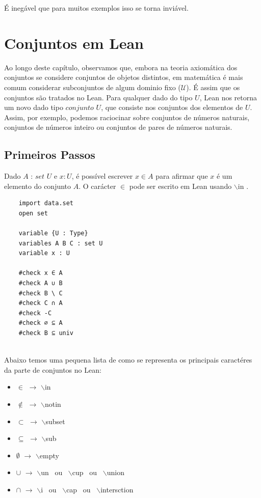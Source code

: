     É inegável que para muitos exemplos isso se torna inviável.

\section{Conjuntos em Lean}
    
    Ao longo deste capítulo, observamos que, embora na teoria axiomática dos conjuntos se considere conjuntos de objetos distintos, em matemática é mais comum considerar subconjuntos de algum dominio fixo ($\mathcal U $). É assim que os conjuntos são tratados no Lean. Para qualquer dado do tipo $U$, Lean nos retorna um novo dado tipo $conjunto$ $U$, que consiste nos conjuntos dos elementos de $U$. Assim, por exemplo, podemos raciocinar sobre conjuntos de números naturais, conjuntos de números inteiro ou conjuntos de pares de números naturais.

\subsection{Primeiros Passos}
    Dado $A$ : $set$ $U$ e $x : U$, é possível escrever $x \in A$ para afirmar que $x$ é um elemento do conjunto $A$. O carácter $\in$ pode ser escrito em Lean usando $\backslash$in .

\begin{lstlisting}
    import data.set
    open set

    variable {U : Type}
    variables A B C : set U
    variable x : U

    #check x ∈ A
    #check A ∪ B
    #check B \ C
    #check C ∩ A
    #check -C
    #check ∅ ⊆ A
    #check B ⊆ univ
    
\end{lstlisting}


Abaixo temos uma pequena lista de como se representa os principais caractéres da parte de conjuntos no Lean: 

\begin{itemize}
  
    \item $\in$ $\rightarrow$ $\backslash$in
  
    \item $\notin$ $\rightarrow$ $\backslash$notin
  
    \item $\subset$ $\rightarrow$ $\backslash$subset
  
    \item $\subseteq$ $\rightarrow$ $\backslash$sub
  
    \item $\emptyset$ $\rightarrow$ $\backslash$empty
  
    \item $\cup$ $\rightarrow$ $\backslash$un \ ou \ $\backslash$cup \ ou \ $\backslash$union
  
    \item $\cap$ $\rightarrow$ $\backslash$i \ ou \ $\backslash$cap \ ou \ $\backslash$intersction

\end{itemize}

